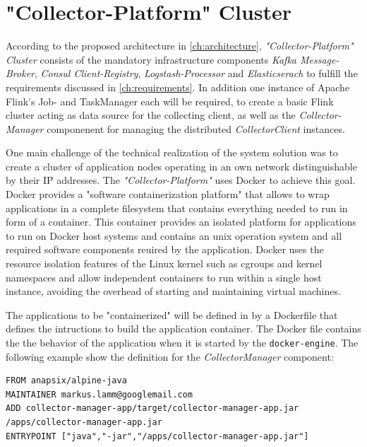 \section{"Collector-Platform" Cluster}

According to the proposed architecture in \autoref{ch:architecture}, \textit{"Collector-Platform" Cluster} consists of the
mandatory infrastructure components \textit{Kafka Message-Broker}, \textit{Consul Client-Registry}, \textit{Logstash-Processor} and
\textit{Elasticserach} to fulfill the requirements discussed in \autoref{ch:requirements}. In addition one instance of
Apache Flink's Job- and TaskManager each will be required, to create a basic Flink cluster acting as data source for the collecting client,
as well as the \textit{Collector-Manager} componenent for managing the distributed \textit{CollectorClient} instances.

One main challenge of the technical realization of the system solution was to create a cluster of application nodes operating in an
own network distinguishable by their IP addresses. The \textit{"Collector-Platform"} uses Docker to achieve this goal.
Docker provides a "software containerization platform" that allows to wrap applications in a complete filesystem that contains everything
needed to run in form of a container. This container provides an isolated platform for applications to run on Docker host systems
and contains an unix operation system and all required software components reuired by the application.
Docker uses the resource isolation features of the Linux kernel such as cgroups and kernel namespaces and allow independent containers
to run within a single host instance, avoiding the overhead of starting and maintaining virtual machines.

The applications to be "containerized" will be defined in by a Dockerfile that defines the intructions to build the application container.
The Docker file contains the the behavior of the application when it is started by the \verb|docker-engine|. The following
example show the definition for the \textit{CollectorManager} component:

\begin{lstlisting}[caption={Dockerfile "CollectorManager"}, captionpos=b, label={lst:dockerfile}]
FROM anapsix/alpine-java
MAINTAINER markus.lamm@googlemail.com
ADD collector-manager-app/target/collector-manager-app.jar /apps/collector-manager-app.jar
ENTRYPOINT ["java","-jar","/apps/collector-manager-app.jar"]
\end{lstlisting}

